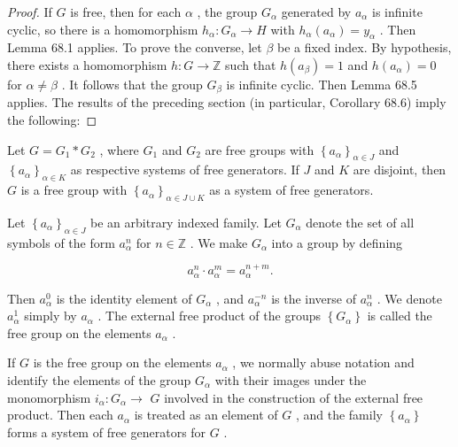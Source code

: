 \begin{proof}If \(G\) is free, then for each \(\alpha\) , the group \({G}_{\alpha }\) generated by \({a}_{\alpha }\) is infinite cyclic, so there is a homomorphism \({h}_{\alpha } : {G}_{\alpha } \rightarrow  H\) with \({h}_{\alpha }\left( {a}_{\alpha }\right)  = {y}_{\alpha }\) . Then Lemma 68.1 applies. To prove the converse, let \(\beta\) be a fixed index. By hypothesis, there exists a homomorphism \(h : G \rightarrow  \mathbb{Z}\) such that \(h\left( {a}_{\beta }\right)  = 1\) and \(h\left( {a}_{\alpha }\right)  = 0\) for \(\alpha  \neq  \beta\) . It follows that the group \({G}_{\beta }\) is infinite cyclic. Then Lemma 68.5 applies.
The results of the preceding section (in particular, Corollary 68.6) imply the following:
\end{proof}
\begin{theorem} Let \(G = {G}_{1} * {G}_{2}\) , where \({G}_{1}\) and \({G}_{2}\) are free groups with \({\left\{  {a}_{\alpha }\right\}  }_{\alpha  \in  J}\) and \({\left\{  {a}_{\alpha }\right\}  }_{\alpha  \in  K}\) as respective systems of free generators. If \(J\) and \(K\) are disjoint, then \(G\) is a free group with \({\left\{  {a}_{\alpha }\right\}  }_{\alpha  \in  J \cup  K}\) as a system of free generators.
\end{theorem}

\begin{definition} Let \({\left\{  {a}_{\alpha }\right\}  }_{\alpha  \in  J}\) be an arbitrary indexed family. Let \({G}_{\alpha }\) denote the set of all symbols of the form \({a}_{\alpha }^{n}\) for \(n \in  \mathbb{Z}\) . We make \({G}_{\alpha }\) into a group by defining

\[
{a}_{\alpha }^{n} \cdot  {a}_{\alpha }^{m} = {a}_{\alpha }^{n + m}.
\]

Then \({a}_{\alpha }^{0}\) is the identity element of \({G}_{\alpha }\) , and \({a}_{\alpha }^{-n}\) is the inverse of \({a}_{\alpha }^{n}\) . We denote \({a}_{\alpha }^{1}\) simply by \({a}_{\alpha }\) . The external free product of the groups \(\left\{  {G}_{\alpha }\right\}\) is called the free group on the elements \({a}_{\alpha }\) .
\end{definition}

If \(G\) is the free group on the elements \({a}_{\alpha }\) , we normally abuse notation and identify the elements of the group \({G}_{\alpha }\) with their images under the monomorphism \({i}_{\alpha } : {G}_{\alpha } \rightarrow\)  \(G\) involved in the construction of the external free product. Then each \({a}_{\alpha }\) is treated as an element of \(G\) , and the family \(\left\{  {a}_{\alpha }\right\}\) forms a system of free generators for \(G\) .


